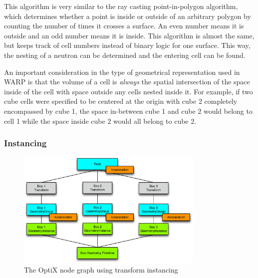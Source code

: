 This algorithm is very similar to the ray casting point-in-polygon algorithm, which determines whether a point is inside or outside of an arbitrary polygon by counting the number of times it crosses a surface.  An even number means it is outside and an odd number means it is inside.  This algorithm is almost the same, but keeps track of cell numbers instead of binary logic for one surface.  This way, the nesting of a neutron can be determined and the entering cell can be found.  


An important consideration in the type of geometrical representation used in WARP is that the volume of a cell is \emph{always} the spatial intersection of the space inside of the cell with space outside any cells nested inside it.  For example, if two cube cells were specified to be centered at the origin with cube 2 completely encompassed by cube 1, the space in-between cube 1 and cube 2 would belong to cell 1 while the space inside cube 2 would all belong to cube 2.

\subsubsection{Instancing}

\begin{figure}[h!] 
  \centering
    \includegraphics[width=0.8\textwidth]{graphics/transform_instancing.eps}
     \caption{The OptiX node graph using transform instancing \label{transform_instancing} }
\end{figure}

